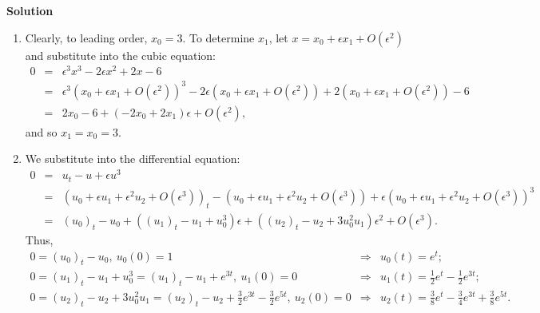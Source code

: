 \documentclass{article}
\begin{document}
\begin{enumerate}
{\bf Solution}

\begin{enumerate}
\item Clearly, to leading order, \(x_0 = 3\).  To determine \(x_1\), let \(x = x_0 + \epsilon x_1 + O(\epsilon^2)\) and substitute into the cubic equation:
\begin{eqnarray*}
0 & = & \epsilon^3 x^3 - 2 \epsilon x^2 + 2 x - 6 \\
  & = & \epsilon^3 \left( x_0 + \epsilon x_1 + O(\epsilon^2) \right)^3 - 2 \epsilon \left( x_0 + \epsilon x_1 + O(\epsilon^2) \right) + 2 \left( x_0 + \epsilon x_1 + O(\epsilon^2) \right) - 6 \\
  & = & 2 x_0 - 6 + \left( -2 x_0 + 2 x_1 \right) \epsilon + O(\epsilon^2),
\end{eqnarray*}
and so \(x_1 = x_0 = 3\).

\item We substitute into the differential equation:
\begin{eqnarray*}
0 & = & u_t - u + \epsilon u^3 \\
  & = & \left( u_0 + \epsilon u_1 + \epsilon^2 u_2 + O(\epsilon^3) \right)_t - \left( u_0 + \epsilon u_1 + \epsilon^2 u_2 + O(\epsilon^3) \right) + \epsilon \left( u_0 + \epsilon u_1 + \epsilon^2 u_2 + O(\epsilon^3) \right)^3 \\
  & = & (u_0)_t - u_0 + \left( (u_1)_t - u_1 + u_0^3 \right) \epsilon + \left( (u_2)_t - u_2 + 3 u_0^2 u_1 \right) \epsilon^2 + O(\epsilon^3).
\end{eqnarray*}
Thus,
\begin{eqnarray*}
0 = (u_0)_t - u_0, \ u_0(0) = 1 & \Rightarrow & u_0(t) = e^t; \\
0 = (u_1)_t - u_1 + u_0^3 = (u_1)_t - u_1 + e^{3 t}, \ u_1(0) = 0 & \Rightarrow & u_1(t) = \frac{1}{2} e^t - \frac{1}{2} e^{3 t}; \\
0 = (u_2)_t - u_2 + 3 u_0^2 u_1 = (u_2)_t - u_2 + \frac{3}{2} e^{3 t} - \frac{3}{2} e^{5 t}, \ u_2(0) = 0 & \Rightarrow & u_2(t) = \frac{3}{8} e^t - \frac{3}{4} e^{3 t} + \frac{3}{8} e^{5 t}.
\end{eqnarray*}

\end{enumerate}



\end{enumerate}
\end{document}
